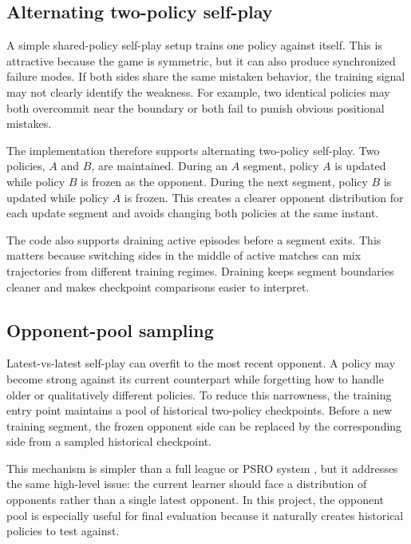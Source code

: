 \documentclass{article}
\begin{document}
\subsection{Alternating two-policy self-play}

A simple shared-policy self-play setup trains one policy against itself. This is attractive because the game is symmetric, but it can also produce synchronized failure modes. If both sides share the same mistaken behavior, the training signal may not clearly identify the weakness. For example, two identical policies may both overcommit near the boundary or both fail to punish obvious positional mistakes.

The implementation therefore supports alternating two-policy self-play. Two policies, $A$ and $B$, are maintained. During an $A$ segment, policy $A$ is updated while policy $B$ is frozen as the opponent. During the next segment, policy $B$ is updated while policy $A$ is frozen. This creates a clearer opponent distribution for each update segment and avoids changing both policies at the same instant.

The code also supports draining active episodes before a segment exits. This matters because switching sides in the middle of active matches can mix trajectories from different training regimes. Draining keeps segment boundaries cleaner and makes checkpoint comparisons easier to interpret.

\subsection{Opponent-pool sampling}

Latest-vs-latest self-play can overfit to the most recent opponent. A policy may become strong against its current counterpart while forgetting how to handle older or qualitatively different policies. To reduce this narrowness, the training entry point maintains a pool of historical two-policy checkpoints. Before a new training segment, the frozen opponent side can be replaced by the corresponding side from a sampled historical checkpoint.

This mechanism is simpler than a full league or PSRO system \citep{lanctot2017psro}, but it addresses the same high-level issue: the current learner should face a distribution of opponents rather than a single latest opponent. In this project, the opponent pool is especially useful for final evaluation because it naturally creates historical policies to test against.
\end{document}
